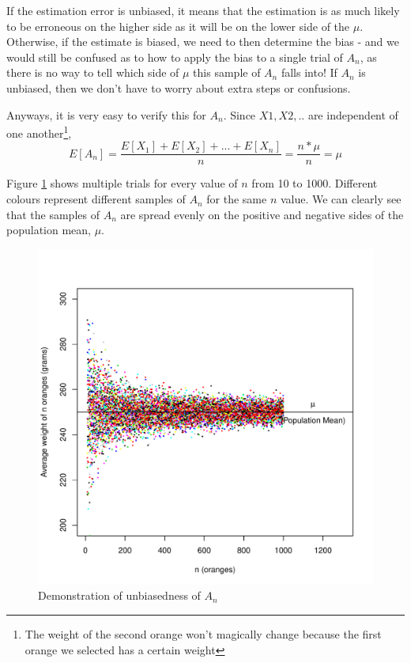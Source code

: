If the estimation error is unbiased, it means that the estimation is as much likely to be erroneous on the higher side as it will be on the lower side of the $\mu$. Otherwise, if the estimate is biased, we need to then determine the bias - and we would still be confused as to how to apply the bias to a single trial of $A_n$, as there is no way to tell which side of $\mu$ this sample of $A_n$ falls into! If $A_n$ is unbiased, then we don't have to worry about extra steps or confusions. 

Anyways, it is very easy to verify this for $A_n$. Since $X1, X2, ..$ are independent of one another\footnote{The weight of the second orange won't magically change because the first orange we selected has a certain weight}, 
		\[E[A_n] 	= \frac{E[X_1]+E[X_2]+...+E[X_n]}{n}
				= \frac{n*\mu}{n}
				= \mu \]

Figure \ref{fig:multiple_trials} shows multiple trials for every value of $n$ from 10 to 1000. Different colours represent different samples of $A_n$ for the same $n$ value. We can clearly see that the samples of $A_n$ are spread evenly on the positive and negative sides of the population mean, $\mu$.	
\begin{figure}
  \centering
    \includegraphics[width=\textwidth]{Statistics/multiple_trials}
  \caption{Demonstration of unbiasedness of $A_n$}
  \label{fig:multiple_trials}
\end{figure}
				
